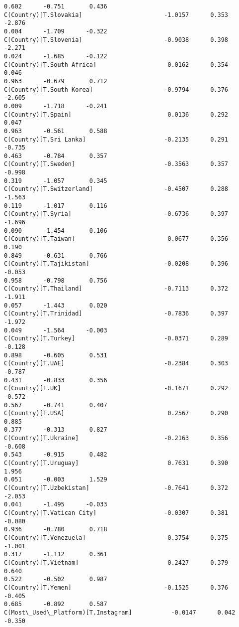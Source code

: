 \documentclass[11pt]{article}
\begin{document}
\begin{Verbatim}[commandchars=\\\{\}]
0.602      -0.751       0.436
C(Country)[T.Slovakia]                       -1.0157      0.353     -2.876
0.004      -1.709      -0.322
C(Country)[T.Slovenia]                       -0.9038      0.398     -2.271
0.024      -1.685      -0.122
C(Country)[T.South Africa]                    0.0162      0.354      0.046
0.963      -0.679       0.712
C(Country)[T.South Korea]                    -0.9794      0.376     -2.605
0.009      -1.718      -0.241
C(Country)[T.Spain]                           0.0136      0.292      0.047
0.963      -0.561       0.588
C(Country)[T.Sri Lanka]                      -0.2135      0.291     -0.735
0.463      -0.784       0.357
C(Country)[T.Sweden]                         -0.3563      0.357     -0.998
0.319      -1.057       0.345
C(Country)[T.Switzerland]                    -0.4507      0.288     -1.563
0.119      -1.017       0.116
C(Country)[T.Syria]                          -0.6736      0.397     -1.696
0.090      -1.454       0.106
C(Country)[T.Taiwan]                          0.0677      0.356      0.190
0.849      -0.631       0.766
C(Country)[T.Tajikistan]                     -0.0208      0.396     -0.053
0.958      -0.798       0.756
C(Country)[T.Thailand]                       -0.7113      0.372     -1.911
0.057      -1.443       0.020
C(Country)[T.Trinidad]                       -0.7836      0.397     -1.972
0.049      -1.564      -0.003
C(Country)[T.Turkey]                         -0.0371      0.289     -0.128
0.898      -0.605       0.531
C(Country)[T.UAE]                            -0.2384      0.303     -0.787
0.431      -0.833       0.356
C(Country)[T.UK]                             -0.1671      0.292     -0.572
0.567      -0.741       0.407
C(Country)[T.USA]                             0.2567      0.290      0.885
0.377      -0.313       0.827
C(Country)[T.Ukraine]                        -0.2163      0.356     -0.608
0.543      -0.915       0.482
C(Country)[T.Uruguay]                         0.7631      0.390      1.956
0.051      -0.003       1.529
C(Country)[T.Uzbekistan]                     -0.7641      0.372     -2.053
0.041      -1.495      -0.033
C(Country)[T.Vatican City]                   -0.0307      0.381     -0.080
0.936      -0.780       0.718
C(Country)[T.Venezuela]                      -0.3754      0.375     -1.001
0.317      -1.112       0.361
C(Country)[T.Vietnam]                         0.2427      0.379      0.640
0.522      -0.502       0.987
C(Country)[T.Yemen]                          -0.1525      0.376     -0.405
0.685      -0.892       0.587
C(Most\_Used\_Platform)[T.Instagram]           -0.0147      0.042     -0.350

\end{Verbatim}
\end{document}
